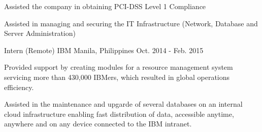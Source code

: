 \begin{cventries}
{\begin{cvitems}
        \item {Assisted the company in obtaining PCI-DSS Level 1 Compliance}
        \item { Assisted in managing and securing the IT Infrastructure (Network, Database and Server Administration)}
        \end{cvitems}
    }
  \cventry
    {Intern (Remote)} %
    {IBM} %
    {Manila, Philippines} %
    {Oct. 2014 - Feb. 2015} %
    {
      \begin{cvitems} %
        \item {Provided support by creating modules for a resource management system servicing more than 430,000 IBMers, which resulted in global operations efficiency.}
        \item {Assisted in the maintenance and upgarde of several databases on an internal cloud infrastructure enabling fast distribution of data, accessible anytime, anywhere and on any device connected to the IBM intranet.}
      \end{cvitems}
    }

\end{cventries}

